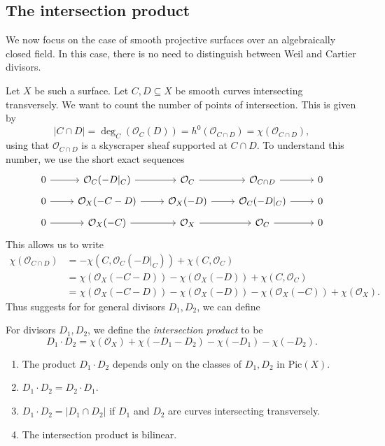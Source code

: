 \documentclass[a4paper]{article}
\newcommand\Pic{\mathrm{Pic}}
\begin{document}
\subsection{The intersection product}
We now focus on the case of smooth projective surfaces over an algebraically closed field. In this case, there is no need to distinguish between Weil and Cartier divisors.

Let $X$ be such a surface. Let $C, D \subseteq X$ be smooth curves intersecting transversely. We want to count the number of points of intersection. This is given by
\[
  |C \cap D| = \deg_C(\mathcal{O}_C(D)) = h^0(\mathcal{O}_{C \cap D}) = \chi(\mathcal{O}_{C \cap D}),
\]
using that $\mathcal{O}_{C \cap D}$ is a skyscraper sheaf supported at $C \cap D$. To understand this number, we use the short exact sequences
\[
  \begin{tikzcd}[row sep=tiny]
    0 \ar[r] & \mathcal{O}_C(-D|_C) \ar[r] & \mathcal{O}_C \ar[r] & \mathcal{O}_{C \cap D} \ar[r] & 0\\
    0 \ar[r] & \mathcal{O}_X(-C - D) \ar[r] & \mathcal{O}_X(-D) \ar[r] & \mathcal{O}_C(-D|_C) \ar[r] & 0\\
    0 \ar[r] & \mathcal{O}_X(-C) \ar[r] & \mathcal{O}_X \ar[r] & \mathcal{O}_C \ar[r] & 0
  \end{tikzcd}
\]
This allows us to write
\begin{align*}
  \chi(\mathcal{O}_{C \cap D}) &= -\chi(C, \mathcal{O}_C(-D|_C)) + \chi(C, \mathcal{O}_C)\\
  &= \chi(\mathcal{O}_X(-C - D)) - \chi(\mathcal{O}_X(-D)) + \chi(C, \mathcal{O}_C)\\
  &= \chi(\mathcal{O}_X(-C - D)) - \chi(\mathcal{O}_X(-D)) - \chi(\mathcal{O}_X(-C)) + \chi(\mathcal{O}_X).
\end{align*}
Thus suggests for for general divisors $D_1, D_2$, we can define
\begin{defi}
  For divisors $D_1, D_2$, we define the \emph{intersection product} to be
  \[
    D_1 \cdot D_2 = \chi(\mathcal{O}_X) + \chi(-D_1 - D_2) - \chi(-D_1) - \chi(-D_2).
  \]
\end{defi}

\begin{prop}\leavevmode
  \begin{enumerate}
    \item The product $D_1 \cdot D_2$ depends only on the classes of $D_1, D_2$ in $\Pic(X)$.
    \item $D_1 \cdot D_2 = D_2 \cdot D_1$.
    \item $D_1 \cdot D_2 = |D_1 \cap D_2|$ if $D_1$ and $D_2$ are curves intersecting transversely.
    \item The intersection product is bilinear.
  \end{enumerate}
\end{prop}
\end{document}
